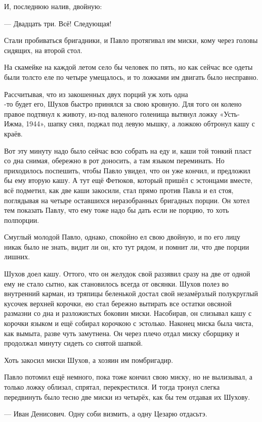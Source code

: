 И, последнюю налив, двойную:

--- Двадцать три. Всё! Следующая!

Стали пробиваться бригадники, и Павло протягивал им миски, кому через головы сидящих, на
второй стол.

На скамейке на каждой летом село бы человек по пять, но как сейчас все одеты были толсто \dash
еле по четыре умещалось, и то ложками им двигать было несправно.

Рассчитывая, что из закошенных двух порций уж хоть одна\\-то будет его, Шухов быстро принялся
за свою кровную. Для того он колено правое подтянул к животу, из-под валеного голенища
вытянул ложку «Усть-Ижма, 1944», шапку снял, поджал под левую мышку, а ложкою обтронул кашу с
краёв.

Вот эту минуту надо было сейчас всю собрать на еду и, каши той тонкий пласт со дна снимая,
обережно в рот доносить, а там языком переминать. Но приходилось поспешить, чтобы Павло
увидел, что он уже кончил, и предложил бы ему вторую кашу. А тут ещё Фетюков, который пришёл с
эстонцами вместе, всё подметил, как две каши закосили, стал прямо против Павла и ел стоя,
поглядывая на четыре оставшихся неразобранных бригадных порции. Он хотел тем показать
Павлу, что ему тоже надо бы дать если не порцию, то хоть полпорции.

Смуглый молодой Павло, однако, спокойно ел свою двойную, и по его лицу никак было не знать,
видит ли он, кто тут рядом, и помнит ли, что две порции лишних.

Шухов доел кашу. Оттого, что он желудок свой раззявил сразу на две \dash от одной ему не стало
сытно, как становилось всегда от овсянки. Шухов полез во внутренний карман, из тряпицы
беленькой достал свой незамёрзлый полукруглый кусочек верхней корочки, ею стал бережно
вытирать все остатки овсяной размазни со дна и разложистых боковин миски. Насобирав, он
слизывал кашу с корочки языком и ещё собирал корочкою с эстолько. Наконец миска была чиста,
как вымыта, разве чуть замутнена. Он через плечо отдал миску сборщику и продолжал минуту
сидеть со снятой шапкой.

Хоть закосил миски Шухов, а хозяин им \dash помбригадир.

Павло потомил ещё немного, пока тоже кончил свою миску, но не вылизывал, а только ложку
облизал, спрятал, перекрестился. И тогда тронул слегка \dash передвинуть было тесно \dash две миски
из четырёх, как бы тем отдавая их Шухову.

--- Иван Денисович. Одну соби визмить, а одну Цезарю отдасьтэ.

